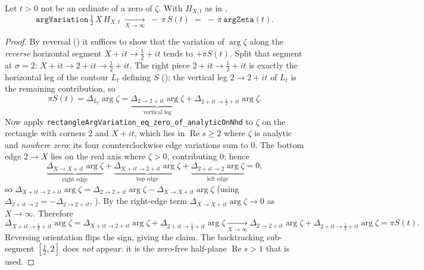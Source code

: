 \begin{lemma}
\label{lem:lb_horiz_argVar_limit}
\leanok
{}
Let $t>0$ not be an ordinate of a zero of $\zeta$. With $H_{X,t}$ as in
,
\[
  \texttt{argVariation}\,\tfrac12\,X\,H_{X,t}
  \;\xrightarrow[X\to\infty]{}\; -\,\pi\,S(t)
  \;=\; -\,\pi\,\texttt{argZeta}(t).
\]
\end{lemma}

\begin{proof}
\leanok
{}
By reversal () it suffices to show that the variation of
$\arg\zeta$ along the \emph{reverse} horizontal segment $X+it\to\tfrac12+it$ tends
to $+\pi S(t)$. Split that segment at $\sigma=2$:
$X+it\to2+it\to\tfrac12+it$. The right piece $2+it\to\tfrac12+it$ is exactly the
horizontal leg of the contour $L_t$ defining $S$ (); the vertical
leg $2\to2+it$ of $L_t$ is the remaining contribution, so
\[
  \pi S(t)=\Delta_{L_t}\arg\zeta
  =\underbrace{\Delta_{2\to2+it}\arg\zeta}_{\text{vertical leg}}
  +\Delta_{2+it\to\tfrac12+it}\arg\zeta .
\]
Now apply \texttt{rectangleArgVariation\_eq\_zero\_of\_analyticOnNhd} to $\zeta$ on
the rectangle with corners $2$ and $X+it$, which lies in $\operatorname{Re}s\ge2$
where $\zeta$ is analytic and \emph{nowhere zero}: its four counterclockwise edge
variations sum to $0$. The bottom edge $2\to X$ lies on the real axis where
$\zeta>0$, contributing $0$; hence
\[
  \underbrace{\Delta_{X\to X+it}\arg\zeta}_{\text{right edge}}
  +\underbrace{\Delta_{X+it\to2+it}\arg\zeta}_{\text{top edge}}
  +\underbrace{\Delta_{2+it\to2}\arg\zeta}_{\text{left edge}}=0 ,
\]
so $\Delta_{X+it\to2+it}\arg\zeta
=\Delta_{2\to2+it}\arg\zeta-\Delta_{X\to X+it}\arg\zeta$ (using
$\Delta_{2+it\to2}=-\Delta_{2\to2+it}$, ). By
 the right-edge term $\Delta_{X\to X+it}\arg\zeta\to0$
as $X\to\infty$. Therefore
\[
  \Delta_{X+it\to\tfrac12+it}\arg\zeta
  =\Delta_{X+it\to2+it}\arg\zeta+\Delta_{2+it\to\tfrac12+it}\arg\zeta
  \xrightarrow[X\to\infty]{}
  \Delta_{2\to2+it}\arg\zeta+\Delta_{2+it\to\tfrac12+it}\arg\zeta=\pi S(t).
\]
Reversing orientation flips the sign, giving the claim. The
backtracking sub-segment $[\tfrac12,2]$ does \emph{not} appear: it is the
zero-free half-plane $\operatorname{Re}s>1$ that is used.
\end{proof}

